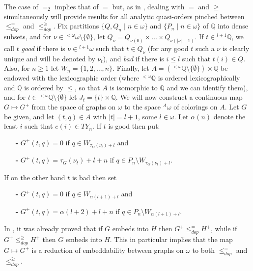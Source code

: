 \documentclass{amsart}
\theoremstyle{definition}
\theoremstyle{remark}
\begin{document}
The case of $=_2$ implies that of $=$ but, as in
\cite{Camerlo}, dealing with $=$ and $\geq$
simultaneously will provide results for all analytic quasi-orders pinched between $\leq_{dop}^=$ and $\leq_{dop}^{\geq }$. Fix partitions $\{ Q, Q_n \mid n \in \omega \}$ and
$\{ P_n \mid n \in \omega \}$ of ${\mathbb{Q}}$ into dense subsets, and for
$\nu \in {{}^{<\omega}\omega} \setminus \{ \emptyset \}$, let $Q_\nu = Q_{\nu(0)}
\times \dotsc \times Q_{\nu(|\nu|-1)}$.
If $t \in {}^{l+1} {\mathbb{Q}} $, we
call $t$ \emph{good} if there is $\nu \in {}^{l+1} \omega$ such that
$t \in Q_\nu$ (for any good $t$ such a $\nu$ is clearly unique and
will be denoted by $\nu_t$), and \emph{bad} if there is $i \leq l$
such that $t(i) \in Q$. Also, for $n \geq 1$ let $W_n = \{ 1,2,
\dotsc , n\}$.  Finally, let $A =({}^{< \omega} {\mathbb{Q}} \setminus \{
\emptyset \} )\times {\mathbb{Q}}$ be endowed with
the lexicographic order (where ${}^{< \omega} {\mathbb{Q}}$ is ordered
lexicographically and ${\mathbb{Q}}$ is ordered by $\leq$, so that $A$ is
isomorphic to ${\mathbb{Q}}$ and we can identify them), and for $t \in {}^{< \omega} {\mathbb{Q}} \setminus \{
\emptyset \}$ let $J_t = \{ t \} \times {\mathbb{Q}}$. We will now construct a
continuous map $G \mapsto G^+$ from the space of graphs on $\omega $ to the space
${}^A \omega$ of colorings on $A$. Let $G$ be given,
and let $(t,q) \in A$ with $|t| = l+1$, some $l \in \omega$.
Let $\alpha(n)$
denote the least $i$ such that $e(i) \in TY_n$.
If $t$ is
good then put:
\begin{itemize}
\item[{\bf -}] $G^+(t,q) = 0$ if $q \in W_{\tau_G(\nu_t) + l}$ and
\item[{\bf -}] $G^+(t,q) = \tau_G(\nu_t) + l + n$ if $q \in P_n \setminus
W_{\tau_G(\nu_t) + l}$.
\end{itemize}
If on the other hand $t$ is bad then set
\begin{itemize}
\item[{\bf -}] $G^+(t,q) = 0$ if $q \in W_{\alpha(l+1) + l}$ and
\item[{\bf -}] $G^+(t,q) =
\alpha(l+2) + l +n$ if $q \in P_n \setminus W_{\alpha(l+1) + l}$.
\end{itemize}

In \cite[Theorem 6]{Camerlo}, it was already proved that if $G$ embeds
into $H$ then $G^+ \leq_{dop}^= H^+$, while if $G^+ \leq_{dop}^\geq
H^+$ then $G$ embeds into $H$. This in particular implies that the map
$G \mapsto G^+$ is a reduction of embeddability between
graphs on $\omega $ to both $\leq_{dop}^=$ and $\leq_{dop}^\geq$.
\end{document}
